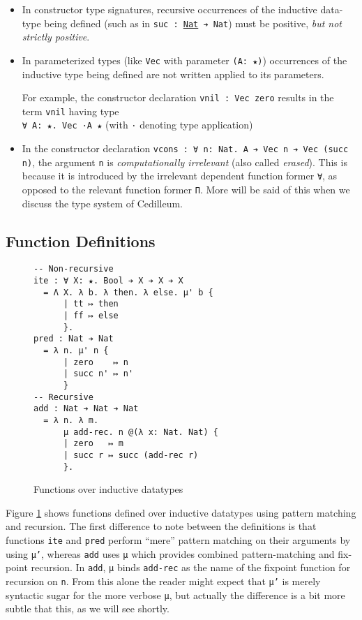 \documentclass{article}
\begin{document}
\begin{itemize}
\item In constructor type signatures, recursive occurrences of the inductive
  data-type being defined (such as in \texttt{suc : \underline{Nat} ➔ Nat}) must
  be positive, \textit{but not strictly positive}.
\item In parameterized types (like \texttt{Vec} with parameter \texttt{(A: ★)})
  occurrences of the inductive type being defined are not written applied to
  its parameters.
  
  For example, the constructor declaration \texttt{vnil : Vec zero} results in
  the term \texttt{vnil} having type \\ \texttt{∀ A: ★. Vec ·A ★} (with \texttt{·}
  denoting type application)
\item In the constructor declaration \texttt{vcons : ∀ n: Nat. A ➔ Vec n ➔ Vec
    (succ n)}, the argument \texttt{n} is \textit{computationally irrelevant}
  (also called \textit{erased}). This is because it is introduced by the
  irrelevant dependent function former \texttt{∀}, as opposed to the relevant
  function former \texttt{Π}. More will be said of this when we discuss the type
  system of Cedilleum.
\end{itemize}

\subsection{Function Definitions}
\begin{figure}[h]
\begin{verbatim}
-- Non-recursive
ite : ∀ X: ★. Bool ➔ X ➔ X ➔ X
  = Λ X. λ b. λ then. λ else. μ' b {
      | tt ↦ then
      | ff ↦ else
      }.
pred : Nat ➔ Nat
  = λ n. μ' n {
      | zero    ↦ n
      | succ n' ↦ n'
      }
-- Recursive
add : Nat ➔ Nat ➔ Nat
  = λ n. λ m.
      μ add-rec. n @(λ x: Nat. Nat) {
      | zero   ↦ m
      | succ r ↦ succ (add-rec r)
      }.
\end{verbatim}
  \caption{Functions over inductive datatypes}
  \label{fig:ex-data-fun}
\end{figure}

Figure \ref{fig:ex-data-fun} shows functions defined over inductive datatypes
using pattern matching and recursion. The first difference to note between the
definitions is that functions \texttt{ite} and \texttt{pred} perform ``mere''
pattern matching on their arguments by using \texttt{μ'}, whereas \texttt{add} uses
\texttt{μ} which provides combined pattern-matching and fix-point recursion. In
\texttt{add}, \texttt{μ} binds \texttt{add-rec} as the name of the fixpoint
function for recursion on \texttt{n}. From this alone the reader might expect
that \texttt{μ'} is merely syntactic sugar for the more verbose \texttt{μ}, but
actually the difference is a bit more subtle that this, as we will see shortly.
\end{document}
